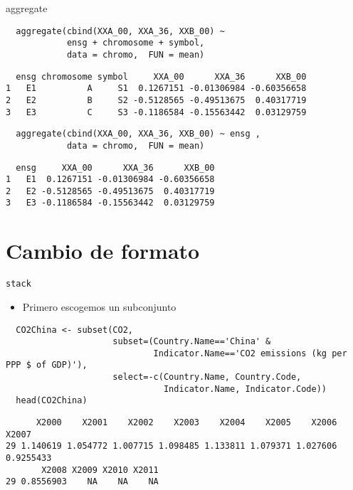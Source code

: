 \documentclass[xcolor={usenames,svgnames,dvipsnames}]{beamer}
\begin{document}
\begin{frame}[fragile,label=sec-3-8]{aggregate}
 \lstset{language=R,label= ,caption= ,numbers=none}
\begin{lstlisting}
  aggregate(cbind(XXA_00, XXA_36, XXB_00) ~
            ensg + chromosome + symbol,
            data = chromo,  FUN = mean)
\end{lstlisting}

\begin{verbatim}
  ensg chromosome symbol     XXA_00      XXA_36      XXB_00
1   E1          A     S1  0.1267151 -0.01306984 -0.60356658
2   E2          B     S2 -0.5128565 -0.49513675  0.40317719
3   E3          C     S3 -0.1186584 -0.15563442  0.03129759
\end{verbatim}

\lstset{language=R,label= ,caption= ,numbers=none}
\begin{lstlisting}
  aggregate(cbind(XXA_00, XXA_36, XXB_00) ~ ensg ,
            data = chromo,  FUN = mean)
\end{lstlisting}

\begin{verbatim}
  ensg     XXA_00      XXA_36      XXB_00
1   E1  0.1267151 -0.01306984 -0.60356658
2   E2 -0.5128565 -0.49513675  0.40317719
3   E3 -0.1186584 -0.15563442  0.03129759
\end{verbatim}
\end{frame}

\section{Cambio de formato}
\label{sec-4}
\begin{frame}[fragile,label=sec-4-1]{\texttt{stack}}
 \begin{itemize}
\item Primero escogemos un subconjunto
\end{itemize}
\lstset{language=R,label= ,caption= ,numbers=none}
\begin{lstlisting}
  CO2China <- subset(CO2,
                     subset=(Country.Name=='China' &
                             Indicator.Name=='CO2 emissions (kg per PPP $ of GDP)'),
                     select=-c(Country.Name, Country.Code,
                               Indicator.Name, Indicator.Code))
  head(CO2China)
\end{lstlisting}

\begin{verbatim}
      X2000    X2001    X2002    X2003    X2004    X2005    X2006     X2007
29 1.140619 1.054772 1.007715 1.098485 1.133811 1.079371 1.027606 0.9255433
       X2008 X2009 X2010 X2011
29 0.8556903    NA    NA    NA
\end{verbatim}
\end{frame}
\end{document}
